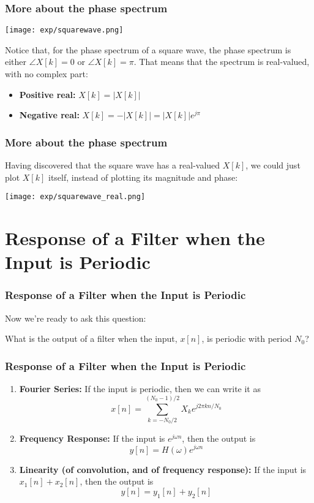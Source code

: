 \documentclass{beamer}
\begin{document}
\begin{frame}
  \frametitle{More about the phase spectrum}
  \centerline{\texttt{[image: exp/squarewave.png]}}
  Notice that, for the phase spectrum of a square wave, the phase
  spectrum is either $\angle X[k]=0$ or $\angle X[k]=\pi$.  That means that the
  spectrum is real-valued, with no complex part:
  \begin{itemize}
  \item {\bf Positive real:} $X[k]=|X[k]|$
  \item {\bf Negative real:} $X[k]=-|X[k]| = |X[k]|e^{j\pi}$
  \end{itemize}
\end{frame}

\begin{frame}
  \frametitle{More about the phase spectrum}
  
  Having discovered that the square wave has a real-valued $X[k]$, we could
  just plot $X[k]$ itself, instead of plotting its magnitude and phase:
  \centerline{\texttt{[image: exp/squarewave\_real.png]}}
\end{frame}


\section[Periodic Signals]{Response of a Filter when the  Input is Periodic}
\setcounter{subsection}{1}

\begin{frame}
  \frametitle{Response of a Filter when the Input is Periodic}

  Now we're ready to ask this question:
  \begin{block}{}
    What is the output of a filter when the  input, $x[n]$, is periodic with
    period $N_0$?
  \end{block}
\end{frame}

\begin{frame}
  \frametitle{Response of a Filter when the Input is Periodic}

  \begin{enumerate}
  \item {\bf Fourier Series:}
    If the input is periodic, then we can write  it as
    \[
    x[n] =\sum_{k=-N_0/2}^{(N_0-1)/2} X_k e^{j2\pi kn/N_0}
    \]
  \item {\bf Frequency Response:}
    If the input is $e^{j\omega n}$, then the output is
    \[
    y[n] = H(\omega)e^{j\omega n}
    \]
  \item {\bf Linearity (of convolution, and of frequency response):}
    If the input is $x_1[n]+x_2[n]$, then the output is
    \[
    y[n] = y_1[n]+y_2[n]
    \]
  \end{enumerate}
\end{frame}
\end{document}
